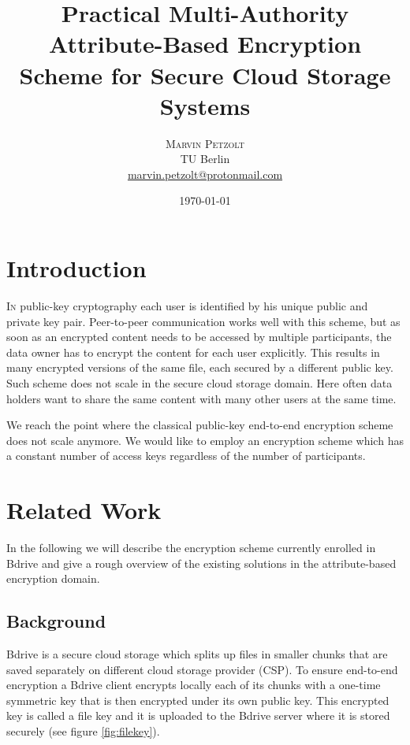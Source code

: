 \documentclass[twocolumn]{article}
\title{Practical Multi-Authority Attribute-Based Encryption Scheme for Secure Cloud Storage Systems } %
\author{%
\textsc{Marvin Petzolt}\\[1ex] %
\normalsize TU Berlin \\ %
\normalsize \href{mailto:marvin.petzolt@protonmail.com}{marvin.petzolt@protonmail.com} %
}
\date{\today} %
\begin{document}
\twocolumn[
    \maketitle
]



\section{Introduction}
\label{sec:introduction}
\lettrine[nindent=0em,lines=3]{I}n public-key cryptography each user is identified by his unique public and private key pair. Peer-to-peer communication works well with this scheme, but as soon as an encrypted content needs to be accessed by multiple participants, the data owner has to encrypt the content for each user explicitly. This results in many encrypted versions of the same  file, each secured by a different public key. Such scheme does not scale in the secure cloud storage domain. Here often data holders want to share the same content with many other users at the same time.

We reach the point where the classical public-key end-to-end encryption scheme does not scale anymore. We would like to employ an encryption scheme which has a constant number of access keys regardless of the number of participants.

\section{Related Work}
In the following we will describe the encryption scheme currently enrolled in Bdrive and give a rough overview of the existing solutions in the attribute-based encryption domain.

\subsection{Background}
Bdrive is a secure cloud storage which splits up files in smaller chunks that are saved separately on different cloud storage provider (CSP). To ensure end-to-end encryption a Bdrive client encrypts locally each of its chunks with a one-time symmetric key that is then encrypted under its own public key. This encrypted key is called a file key and it is uploaded to the Bdrive server where it is stored securely (see figure \ref{fig:filekey}).
\end{document}

